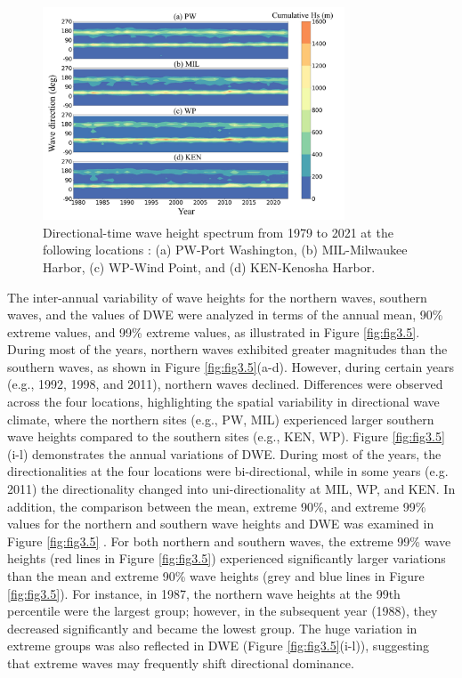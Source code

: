 \begin{figure}[htbp]
  \centering
  \includegraphics[width=0.8\textwidth]{chapter3/resources/figure3-4.jpg}
  \caption{Directional-time wave height spectrum from 1979 to 2021 at the following locations : (a) PW-Port Washington, (b) MIL-Milwaukee Harbor, (c) WP-Wind Point, and (d) KEN-Kenosha Harbor.}
  \label{fig:fig3.4}
\end{figure}

The inter-annual variability of wave heights for the northern waves, southern waves, and the values of DWE were analyzed in terms of the annual mean, 90\% extreme values, and 99\% extreme values, as illustrated in Figure \ref{fig:fig3.5}. During most of the years, northern waves exhibited greater magnitudes than the southern waves, as shown in Figure \ref{fig:fig3.5}(a-d). However, during certain years (e.g., 1992, 1998, and 2011), northern waves declined. Differences were observed across the four locations, highlighting the spatial variability in directional wave climate, where the northern sites (e.g., PW, MIL) experienced larger southern wave heights compared to the southern sites (e.g., KEN, WP). Figure \ref{fig:fig3.5}(i-l) demonstrates the annual variations of DWE. During most of the years, the directionalities at the four locations were bi-directional, while in some years (e.g. 2011) the directionality changed into uni-directionality at MIL, WP, and KEN. In addition, the comparison between the mean, extreme 90\%, and extreme 99\% values for the northern and southern wave heights and DWE was examined in Figure \ref{fig:fig3.5} . For both northern and southern waves, the extreme 99\% wave heights (red lines in Figure \ref{fig:fig3.5}) experienced significantly larger variations than the mean and extreme 90\% wave heights (grey and blue lines in Figure \ref{fig:fig3.5}). For instance, in 1987, the northern wave heights at the 99th percentile were the largest group; however, in the subsequent year (1988), they decreased significantly and became the lowest group. The huge variation in extreme groups was also reflected in DWE (Figure \ref{fig:fig3.5}(i-l)), suggesting that extreme waves may frequently shift directional dominance.

